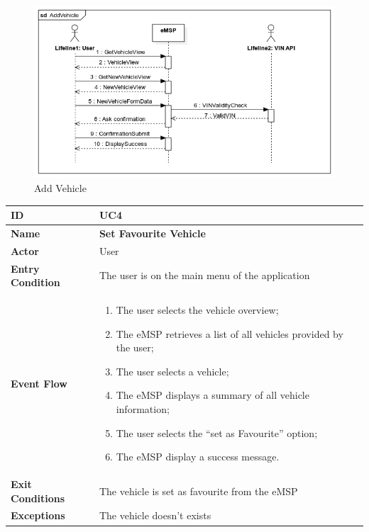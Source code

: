 \documentclass{Configuration_Files/PoliMi3i_thesis}
\begin{document}
\begin{figure}[H]
    \centering
    \includegraphics[width=1\textwidth]{Images/UseCases/AddVehicle.jpg}
    \caption{Add Vehicle}
\end{figure}


\newpage\begin{table}[H]
    \begin{xltabular}{\textwidth}{| >{}l | X |}
    \hline
    \textbf{ID} & \textbf{UC4}\T\B\\
    \hline
    \textbf{Name} & \textbf{Set Favourite Vehicle}\T\B\\
    \hline \hline
    \textbf{Actor} & User\T\B \\
    \hline
    \textbf{Entry Condition} & The user is on the main menu of the application\T\B\\
    \hline
    \textbf{Event Flow} & 
        \begin{enumerate}
        \item The user selects the vehicle overview;
        \item The eMSP retrieves a list of all vehicles provided by the user;
        \item The user selects a vehicle;
        \item The eMSP displays a summary of all vehicle information;
        \item The user selects the “set as Favourite” option;
        \item The eMSP display a success message.
        \end{enumerate}\B\\
    \hline
    \textbf{Exit Conditions} & The vehicle is set as favourite from the eMSP\B\\
    \hline
    \textbf{Exceptions} & The vehicle doesn't exists\B\\
    \hline
    \end{xltabular}
\end{table}
\end{document}
